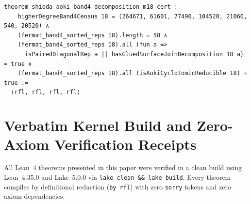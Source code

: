 \documentclass[11pt,a4paper]{article}
\begin{document}
\begin{lstlisting}[caption={Prime-degree Band-1 purity and glued surface-join Band-4 decomposition in \texttt{HigherDegreeSporadicBand4.lean}.}]
theorem shioda_aoki_band4_decomposition_m18_cert :
    higherDegreeBand4Census 18 = (264671, 61601, 77490, 104520, 21060, 540, 20520) ∧
    (fermat_band4_sorted_reps 18).length = 58 ∧
    (fermat_band4_sorted_reps 18).all (fun a =>
      isPairedDiagonalRep a || hasGluedSurfaceJoinDecomposition 18 a) = true ∧
    (fermat_band4_sorted_reps 18).all (isAokiCyclotomicReducible 18) = true :=
  ⟨rfl, rfl, rfl, rfl⟩
\end{lstlisting}

\appendix
\section{Verbatim Kernel Build and Zero-Axiom Verification Receipts}

All Lean~4 theorems presented in this paper were verified in a clean build using Lean~4.35.0 and Lake~5.0.0 via \texttt{lake clean \&\& lake build}. Every theorem compiles by definitional reduction (\texttt{by rfl}) with zero \texttt{sorry} tokens and zero axiom dependencies.
\end{document}
